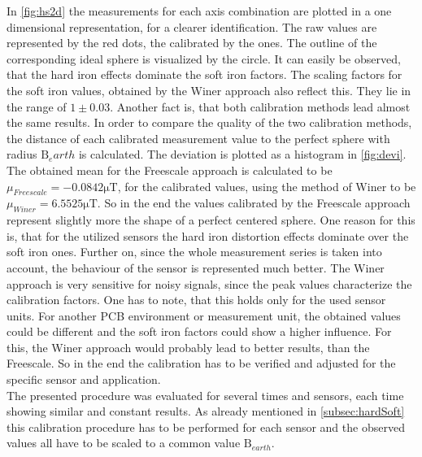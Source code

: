 In \ref{fig:hs2d} the measurements for each axis combination are plotted in a one dimensional representation, for a clearer identification. The raw values are represented by the red dots, the calibrated by the  ones. The outline of the corresponding ideal sphere is visualized by the  circle. It can easily be observed, that the hard iron effects dominate the soft iron factors. The scaling factors for the soft iron values, obtained by the Winer approach also reflect this. They lie in the range of $ 1 \pm 0.03 $. Another fact is, that both calibration methods lead almost the same results. In order to compare the quality of the two calibration methods, the distance of each calibrated measurement value to the perfect sphere with radius $ \mathrm{B}_earth $ is calculated. The deviation is plotted as a histogram in \ref{fig:devi}. The obtained mean for the Freescale approach is calculated to be $ \mu_{Freescale} = -0.0842\si{\micro \tesla} $, for the calibrated values, using the method of Winer to be $ \mu_{Winer} = 6.5525\si{\micro \tesla} $. So in the end the values calibrated by the Freescale approach represent slightly more the shape of a perfect centered sphere. One reason for this is, that for the utilized sensors the hard iron distortion effects dominate over the soft iron ones. Further on, since the whole measurement series is taken into account, the behaviour of the sensor is represented much better. The Winer approach is very sensitive for noisy signals, since the peak values characterize the calibration factors. One has to note, that this holds only for the used sensor units. For another \ac{PCB} environment or measurement unit, the obtained values could be different and the soft iron factors could show a higher influence. For this, the Winer approach would probably lead to better results, than the Freescale. So in the end the calibration has to be verified and adjusted for the specific sensor and application.\\
The presented procedure was evaluated for several times and sensors, each time showing similar and constant results. As already mentioned in \ref{subsec:hardSoft} this calibration procedure has to be performed for each sensor and the observed values all have to be scaled to a common value $ \mathrm{B}_{earth} $.


\begin{figure}
\centering
	\hfill
\caption{}
\end{figure}


